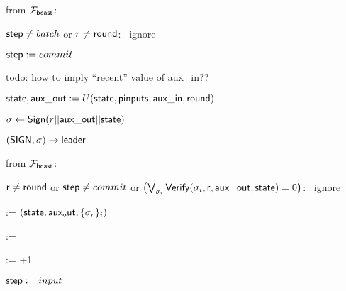 \begin{bbox}[title={$\Pi_{\msf{state}} (\msf{sid}, \msf{pid}, U, \mathcal{C}_{\msf{aux}}, \mathcal{C}_{\msf{state}}, \msf{leader}, \msf{peers}=p_1,...p_n)$}]
\OnInput {} from $\mathcal{F}_{{\mathsf {bcast}}}$:

	\quad \If ${\mathsf {step}} \neq batch$ or $r \neq {\mathsf {round}}$: \ ignore

	\quad ${\mathsf {step}} := commit$

	\quad todo: how to imply ``recent'' value of aux\_in??

	\quad ${\mathsf {state}},{\mathsf {aux\_out}} := U({\mathsf {state}}, {\mathsf {pinputs}}, {\mathsf {aux\_in}}, {\mathsf {round}})$

	\quad $\sigma \leftarrow {\mathsf {Sign}}(r || {\mathsf {aux\_out}} || {\mathsf {state}})$

	\quad \Send $({\mathsf {SIGN}}, \sigma) \rightarrow {\mathsf {leader}}$


\OnInput {} from $\mathcal{F}_{{\mathsf {bcast}}}$:

	\quad \If ${\mathsf {r}} \neq {\mathsf {round}}$ or ${\mathsf {step}} \neq commit$ or $\left( \bigvee_{\sigma_i} {\mathsf {Verify}}(\sigma_i,{\mathsf {r}},{\mathsf {aux\_out}},{\mathsf {state}}) = 0 \right)$: \ ignore

	\quad {} := $({\mathsf {state}},{\mathsf {aux_out}},\{\sigma_r\}_i)$

	\quad {} := 

	\quad {} := +1

	\quad ${\mathsf {step}} := input$

\end{bbox}
